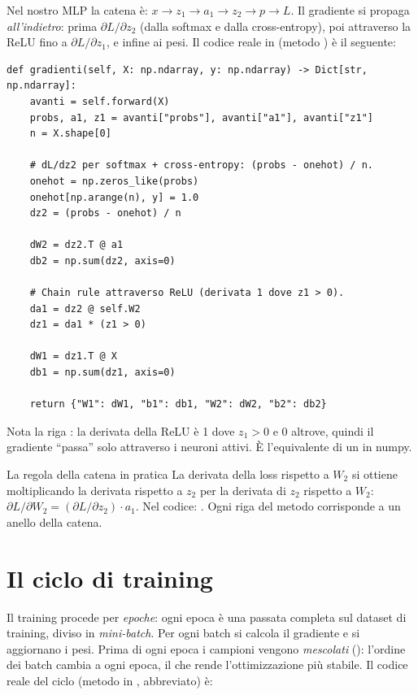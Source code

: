 Nel nostro MLP la catena è: $x \to z_1 \to a_1 \to z_2 \to p \to L$. Il
gradiente si propaga \emph{all'indietro}: prima $\partial L / \partial z_2$
(dalla softmax e dalla cross-entropy), poi attraverso la ReLU fino a
$\partial L / \partial z_1$, e infine ai pesi. Il codice reale in
 (metodo )
è il seguente:

\begin{lstlisting}[caption={Backpropagation in \file{mlp.py} (metodo \codice{gradienti}).}]
def gradienti(self, X: np.ndarray, y: np.ndarray) -> Dict[str, np.ndarray]:
    avanti = self.forward(X)
    probs, a1, z1 = avanti["probs"], avanti["a1"], avanti["z1"]
    n = X.shape[0]

    # dL/dz2 per softmax + cross-entropy: (probs - onehot) / n.
    onehot = np.zeros_like(probs)
    onehot[np.arange(n), y] = 1.0
    dz2 = (probs - onehot) / n

    dW2 = dz2.T @ a1
    db2 = np.sum(dz2, axis=0)

    # Chain rule attraverso ReLU (derivata 1 dove z1 > 0).
    da1 = dz2 @ self.W2
    dz1 = da1 * (z1 > 0)

    dW1 = dz1.T @ X
    db1 = np.sum(dz1, axis=0)

    return {"W1": dW1, "b1": db1, "W2": dW2, "b2": db2}
\end{lstlisting}

Nota la riga : la derivata della ReLU è 1 dove
$z_1 > 0$ e 0 altrove, quindi il gradiente ``passa'' solo attraverso i
neuroni attivi. È l'equivalente di un  in numpy.

\begin{esempio}{La regola della catena in pratica}
La derivata della loss rispetto a $W_2$ si ottiene moltiplicando la
derivata rispetto a $z_2$ per la derivata di $z_2$ rispetto a $W_2$:
$\partial L / \partial W_2 = (\partial L / \partial z_2) \cdot a_1$.
Nel codice: . Ogni riga del metodo
 corrisponde a un anello della catena.
\end{esempio}

\section{Il ciclo di training}\label{sec:ciclo-training}

Il training procede per \emph{epoche}: ogni epoca è una passata completa sul
dataset di training, diviso in \emph{mini-batch}. Per ogni batch si calcola
il gradiente e si aggiornano i pesi. Prima di ogni epoca i campioni vengono
\emph{mescolati} (): l'ordine dei batch cambia a
ogni epoca, il che rende l'ottimizzazione più stabile. Il codice reale del
ciclo (metodo  in ,
abbreviato) è:

